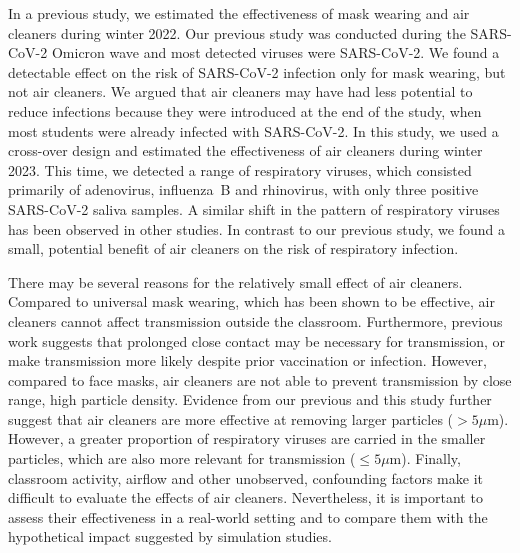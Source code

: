 \documentclass[fleqn,11pt]{wlscirep}
\begin{document}

In a previous study\cite{Banholzer2023PLoSMed}, we estimated the effectiveness of mask wearing and air cleaners during winter 2022. Our previous study was conducted during the SARS-CoV-2 Omicron wave and most detected viruses were SARS-CoV-2. We found a detectable effect on the risk of SARS-CoV-2 infection only for mask wearing, but not air cleaners. We argued that air cleaners may have had less potential to reduce infections because they were introduced at the end of the study, when most students were already infected with SARS-CoV-2. In this study, we used a cross-over design and estimated the effectiveness of air cleaners during winter 2023. This time, we detected a range of respiratory viruses, which consisted primarily of adenovirus, influenza~B and rhinovirus, with only three positive SARS-CoV-2 saliva samples. A similar shift in the pattern of respiratory viruses has been observed in other studies\cite{Nygaard2023Lancet,Sauteur2022EuroSurv}. In contrast to our previous study, we found a small, potential benefit of air cleaners on the risk of respiratory infection. 


There may be several reasons for the relatively small effect of air cleaners. Compared to \eg universal mask wearing, which has been shown to be effective\cite{Banholzer2023PLoSMed,Heinsohn2022,Gettings2021,Leung2020NatMed,Milton2013PLoSPathogens}, air cleaners cannot affect transmission outside the classroom. Furthermore, previous work suggests that prolonged close contact may be necessary for transmission\cite{Leung2020NatMed,Brankston2007LancetID}, or make transmission more likely despite prior vaccination or infection\cite{Lind2023NatCommun}. However, compared to face masks, air cleaners are not able to prevent transmission by close range, high particle density. Evidence from our previous\cite{Banholzer2023PLoSMed} and this study further suggest that air cleaners are more effective at removing larger particles ($>5\mu$m). However, a greater proportion of respiratory viruses are carried in the smaller particles, which are also more relevant for transmission ($\leq5\mu$m)\cite{Fennelly2020}. Finally, classroom activity, airflow and other unobserved, confounding factors make it difficult to evaluate the effects of air cleaners. Nevertheless, it is important to assess their effectiveness in a real-world setting and to compare them with the hypothetical impact suggested by simulation studies\cite{Lindsley2021,Cortellessa2023Build}.
\end{document}
